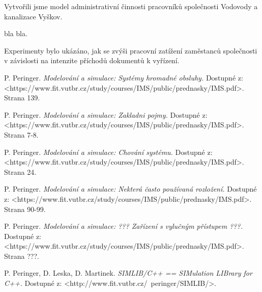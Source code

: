 \documentclass[12pt,a4paper]{article}
\begin{document}
Vytvořili jsme model administrativní činnosti pracovníků společnosti Vodovody a kanalizace Vyškov.

 bla bla.

Experimenty bylo ukázáno, jak se zvýši pracovní zatížení zaměstanců společnosti v závislosti na intenzite příchodů
dokumentů k vyřízení.


\newpage

\begin{thebibliography}{99}

 P. Peringer.
\textit{Modelování a simulace: Systémy hromadné obsluhy.}
Dostupné z: \textless https://www.fit.vutbr.cz/study/courses/IMS/public/prednasky/IMS.pdf\textgreater.
Strana 139.

 P. Peringer.
\textit{Modelování a simulace: Zakladni pojmy.}
Dostupné z: \textless https://www.fit.vutbr.cz/study/courses/IMS/public/prednasky/IMS.pdf\textgreater.
Strana 7-8.

 P. Peringer.
\textit{Modelování a simulace: Chování systému.}
Dostupné z: \textless https://www.fit.vutbr.cz/study/courses/IMS/public/prednasky/IMS.pdf\textgreater.
Strana 24.

 P. Peringer.
\textit{Modelování a simulace: Nekterá často používaná rozložení.}
Dostupné z: \textless https://www.fit.vutbr.cz/study/courses/IMS/public/prednasky/IMS.pdf\textgreater.
Strana 90-99.

 P. Peringer.
\textit{Modelování a simulace: ??? Zařízení s vylučným přístupem ???.}
Dostupné z: \textless https://www.fit.vutbr.cz/study/courses/IMS/public/prednasky/IMS.pdf\textgreater.
Strana ???.

 P. Peringer, D. Leska, D. Martinek.
\textit{SIMLIB/C++  ==  SIMulation LIBrary for C++.}
Dostupné z: \textless http://www.fit.vutbr.cz/~peringer/SIMLIB/\textgreater.


\end{thebibliography}
\end{document}
